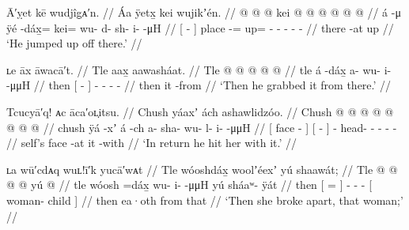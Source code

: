 
\ex\label{ex:91-267-he-jumped-up-off}%
%
\begingl
	\glpreamble	Ā′ỵet kē wudjîg̣ᴀ′n. //
	\glpreamble	Áa ÿetx̱ kei wujikʼén. //
	\gla	{}  @ {} {}  @ {} @ kei @
		 @ {} @ {} @ {} @ {} @ {} //
	\glb	{} á -μ {} ÿé -dáx̱= kei= wu- d- sh- i-  -μH //
	\glc	{}[  - {}] place -= up=
		- - - -  - //
	\gld	{} there -at {}  {} up  {} {} {} {} {} //
	\glft	‘He jumped up off there.’
		//
\endgl
\xe

\ex\label{ex:91-268-grabbed-it}%
%
\begingl
	\glpreamble	ʟe āx āwacā′t. //
	\glpreamble	Tle aax̱ aawasháat. //
	\gla	Tle {}  @ {} {}  @ {} @ {} @ {} @ {} //
	\glb	tle {} á -dáx̱ {} a- wu- i-  -μμH //
	\glc	then {}[  - {}]
		- - -  - //
	\gld	then {} it -from {}  {} {} {} {} //
	\glft	‘Then he grabbed it from there.’
		//
\endgl
\xe

\ex\label{ex:91-269-hit-her-with-it}%
%
\begingl
	\glpreamble	Tcucyā′q! ᴀc āca′oʟ̣itsu. //
	\glpreamble	Chush yáaxʼ ách ashawlidzóo. //
	\gla	{} Chush  @ {} {} {}  @ {} {}
		 @ {} @ {} @ {} @ {} @ {} @ {} //
	\glb	{} chush ÿá -xʼ {} {} á -ch {}
		a- sha- wu- l- i-  -μμH //
	\glc	{}[  face - {}] {}[  - {}]
		- head- - - -  - //
	\gld	{} self’s face -at {} {} it -with {}
		 {} {} {} {} {} {} //
	\glft	‘In return he hit her with it.’
		//
\endgl
\xe


\ex\label{ex:91-270-she-broke-apart}%
%
\begingl
	\glpreamble	ʟa wū′cdᴀq wuʟ!ī′k yucā′wᴀt //
	\glpreamble	Tle wóoshdáx̱ woolʼéexʼ yú shaawát; //
	\gla	Tle {}  @ {} {}
		 @ {} @ {} @ {}
		{} yú  @ {} {} //
	\glb	tle {} wóosh =dáx̱ {}
		wu- i-  -μμH
		{} yú sháaʷ- ÿát {} //
	\glc	then {}[  = {}]
		- -  -
		{}[  woman- child {}] //
	\gld	then {} ea·oth \•from {}
		 {} {} {}
		{} that  {} {} //
	\glft	‘Then she broke apart, that woman;’
		//
\endgl
\xe

